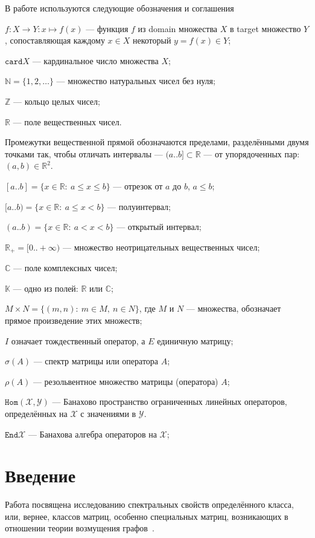 \documentclass[14pt,a4paper]{extarticle}
\numberwithin{equation}{section}
\theoremstyle{definition}
\begin{document}
В работе используются следующие обозначения и соглашения

\( f: X\to Y: x\mapsto f(x) \) --- функция \( f \)
из domain множества \( X \) в target множество \( Y \),
сопоставляющая каждому \( x\in X \) некоторый \( y=f(x) \in Y\);

\( \mathtt{card}X \) --- кардинальное число множества \( X \);

\( \mathbb{N} = \{ 1, 2, \ldots \}\) --- множество натуральных чисел без нуля;

\( \mathbb{Z} \) --- кольцо целых чисел;

\( \mathbb{R} \) --- поле вещественных чисел.

Промежутки вещественной прямой обозначаются пределами, раз\-дел\-ёнными двумя
точками так, чтобы отличать интервалы  ---
\( (a..b] \subset \mathbb{R} \) --- от упорядоченных пар: \( (a, b)\in\mathbb{R}^2 \).

\( [a..b] = \{ x\in\mathbb{R}:\ a\leq x\leq b\} \) --- отрезок
от \( a \) до \( b \), \( a\leq b \);

\( [a..b) = \{ x\in\mathbb{R}:\ a\leq x < b\} \) --- полуинтервал;

\( (a..b) = \{ x\in\mathbb{R}:\ a < x < b\} \) --- открытый интервал;

\( \mathbb{R}_+ = [0..+\infty) \) --- множество неотрицательных вещественных чисел;

\( \mathbb{C} \) --- поле комплексных чисел;

\( \mathbb{K} \) --- одно из полей: \( \mathbb{R} \) или \( \mathbb{C} \);

\( M{\times}N = \{ (m, n):\ m{\in}M,\ n{\in}N \} \), где \( M \) и \( N \)
--- множества, обозначает прямое произведение этих множеств;

\( I \) означает тождественный оператор, а \( E \) единичную матрицу;

\( \sigma(A) \) --- спектр матрицы или оператора \( A \);

\( \rho(A) \) --- резольвентное множество матрицы (оператора) \( A \);

\( \mathtt{Hom}(\mathscr{X}, \mathscr{Y})\) --- Банахово пространство ограни\-чен\-ных
линейных операторов, определённых на \( \mathscr{X} \) с значениями в \( \mathscr{Y} \).

\( \mathtt{End}\mathscr{X} \) --- Банахова алгебра операторов на
\( \mathscr{X} \);

\newpage

\section{Введение}
Работа посвящена исследованию спектральных свойств определённого класса, или,
вернее, классов матриц,
особенно специальных матриц, возникающих в отношении теории возмущения
графов~\cite{cvetkovic1997eigenspaces}.
\end{document}
